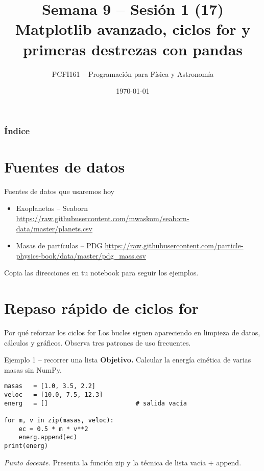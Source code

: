 \documentclass[10pt]{beamer}
\title{Semana 9 – Sesión 1 (17)\\Matplotlib avanzado, ciclos for y primeras destrezas con pandas}
\author{PCFI161 – Programación para Física y Astronomía}
\date{\today}
\begin{document}
\myfront{}

\begin{frame}\titlepage\end{frame}

\begin{frame}\frametitle{Índice}\tableofcontents\end{frame}

\section{Fuentes de datos}
\begin{frame}{Fuentes de datos que usaremos hoy}
\begin{itemize}
  \item Exoplanetas – Seaborn  
        \url{https://raw.githubusercontent.com/mwaskom/seaborn-data/master/planets.csv}
  \item Masas de partículas – PDG  
        \url{https://raw.githubusercontent.com/particle-physics-book/data/master/pdg\_mass.csv}
\end{itemize}
Copia las direcciones en tu notebook para seguir los ejemplos.
\end{frame}

\section{Repaso rápido de ciclos for}
\begin{frame}{Por qué reforzar los ciclos for}
Los bucles siguen apareciendo en limpieza de datos, cálculos y gráficos.  
Observa tres patrones de uso frecuentes.
\end{frame}

\begin{frame}[fragile]{Ejemplo 1 – recorrer una lista}
\textbf{Objetivo.} Calcular la energía cinética de varias masas sin NumPy.
\begin{verbatim}
masas   = [1.0, 3.5, 2.2]
veloc   = [10.0, 7.5, 12.3]
energ   = []                        # salida vacía

for m, v in zip(masas, veloc):
    ec = 0.5 * m * v**2
    energ.append(ec)
print(energ)
\end{verbatim}
\textit{Punto docente.} Presenta la función zip y la técnica de lista vacía + append.
\end{frame}
\end{document}

